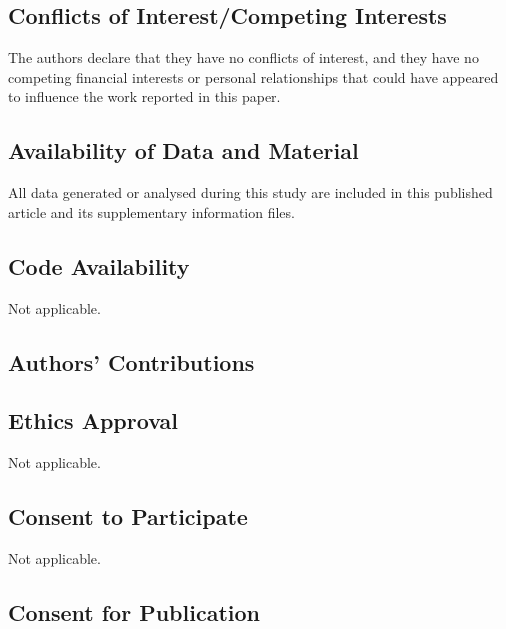 \subsection*{Conflicts of Interest/Competing Interests}
	
The authors declare that they have no conflicts of interest, and they have no competing financial interests or personal relationships that could have appeared to influence the work reported in this paper.
	
\subsection*{Availability of Data and Material}
	
All data generated or analysed during this study are included in this published article and its supplementary information files.
	
\subsection*{Code Availability}
	
Not applicable.
	
\subsection*{Authors' Contributions}
	
	
\subsection*{Ethics Approval}
	
Not applicable.
	
\subsection*{Consent to Participate}
	
Not applicable.
	
\subsection*{Consent for Publication}
	
